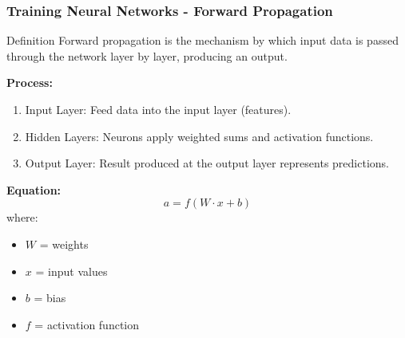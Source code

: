 \documentclass{beamer}
\begin{document}
\begin{frame}[fragile]
    \frametitle{Training Neural Networks - Forward Propagation}
    \begin{block}{Definition}
        Forward propagation is the mechanism by which input data is passed through the network layer by layer, producing an output.
    \end{block}
    
    \textbf{Process:}
    \begin{enumerate}
        \item Input Layer: Feed data into the input layer (features).
        \item Hidden Layers: Neurons apply weighted sums and activation functions.
        \item Output Layer: Result produced at the output layer represents predictions.
    \end{enumerate}

    \textbf{Equation:}
    \begin{equation}
        a = f(W \cdot x + b)
    \end{equation}
    where:
    \begin{itemize}
        \item \( W \) = weights
        \item \( x \) = input values
        \item \( b \) = bias
        \item \( f \) = activation function
    \end{itemize}
\end{frame}
\end{document}

